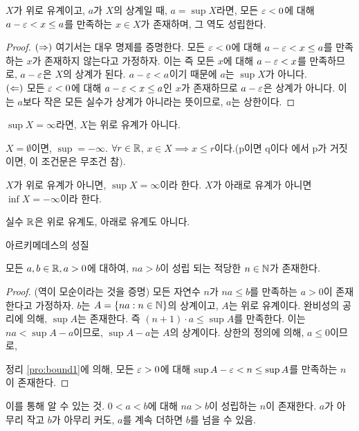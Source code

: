 \begin{proposition}
  $X$가 위로 유계이고, $a$가 $X$의 상계일 때, $a = \sup X$라면, 모든 $\varepsilon < 0$에 대해
  $a - \varepsilon < x \leq a$를 만족하는 $x \in X$가 존재하며, 그 역도 성립한다.
  \label{pro:bound1}
\end{proposition}

\begin{proof}
  $(\Rightarrow)$ 여기서는 대우 명제를 증명한다. 모든 $\varepsilon < 0$에 대해 $a -
    \varepsilon < x \leq a$를 만족하는 $x$가 존재하지 않는다고 가정하자. 이는 즉
  모든 $x$에 대해 $a - \varepsilon < x$를 만족하므로, $a - \varepsilon$은 $X$의
  상계가 된다. $a - \varepsilon < a$이기 때문에 $a$는 $\sup X$가 아니다. \\
  $(\Leftarrow)$ 모든 $\varepsilon < 0$에 대해 $a - \varepsilon < x \leq a$인 $x$가
  존재하므로 $a - \varepsilon$은 상계가 아니다. 이는 $a$보다 작은 모든 실수가
  상계가 아니라는 뜻이므로, $a$는 상한이다.
\end{proof}

$\sup X = \infty$라면, $X$는 위로 유계가 아니다.

$X = \emptyset$이면, $\sup = -\infty$.
$\forall r \in \mathbb{R}$, $x \in X \implies x \leq r$이다.(p이면 q이다 에서 p가
거짓이면, 이 조건문은 무조건 참).

\begin{definition}
  $X$가 위로 유계가 아니면, $\sup X = \infty$이라 한다.
  $X$가 아래로 유계가 아니면 $\inf X = -\infty$이라 한다.
  \label{def:not_bound}
\end{definition}

실수 $\mathbb{R}$은 위로 유계도, 아래로 유계도 아니다.

아르키메데스의 성질
\begin{theorem}
  모든 $a, b \in \mathbb{R}, a > 0$에 대하여, $na > b$이 성립 되는 적당한 $n \in \mathbb{N}$가 존재한다.
  \label{thm:arc}
\end{theorem}

\begin{proof}
  (역이 모순이라는 것을 증명)
  모든 자연수 $n$가 $na \le b$를 만족하는 $a > 0$이 존재한다고 가정하자.
  $b$는 $A = \{na : n \in \mathbb{N}\}$의 상계이고, $A$는 위로 유계이다.
  완비성의 공리에 의해, $\sup A$는 존재한다.
  즉 $(n + 1) \cdot a \le \sup A$를 만족한다. 이는
  $na < \sup A - a$이므로,  $\sup A - a$는 $A$의 상계이다.
  상한의 정의에 의해, $a \le 0$이므로,

  정리 \ref{pro:bound1}에 의해, 모든 $\varepsilon > 0$에 대해
  $\sup A - \varepsilon < n \le \sup A$를 만족하는 $n$이 존재한다.
\end{proof}

이를 통해 알 수 있는 것. $0 < a < b$에 대해 $na > b$이 성립하는 $n$이 존재한다.
$a$가 아무리 작고 $b$가 아무리 커도, $a$를 계속 더하면 $b$를 넘을 수 있음.

